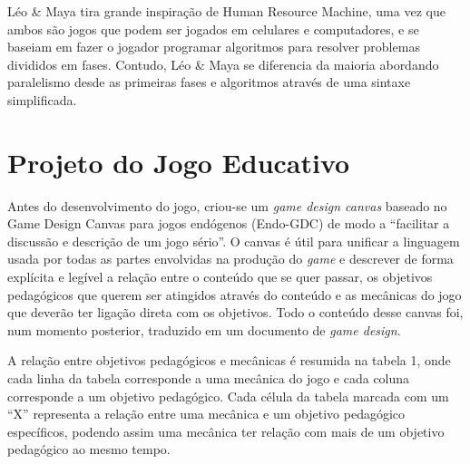 \documentclass[conference]{IEEEtran}
\begin{document}
Léo \& Maya tira grande inspiração de Human Resource Machine\cite{humanresourcemachine}, uma vez que ambos são jogos que podem ser jogados em celulares e computadores, e se baseiam em fazer o jogador programar algoritmos para resolver problemas  divididos em fases. Contudo, Léo \& Maya se diferencia da maioria abordando paralelismo desde as primeiras fases e algoritmos através de uma sintaxe simplificada.

\section{Projeto do Jogo Educativo}
Antes do desenvolvimento do jogo, criou-se um \textit{game design canvas} baseado no Game Design Canvas para jogos endógenos (Endo-GDC) de modo a ``facilitar a discussão e descrição de um jogo sério''\cite{taucei_endo-gdc_nodate}. O canvas é útil para unificar a linguagem usada por todas as partes envolvidas na produção do \textit{game} e descrever de forma explícita e legível a relação entre o conteúdo que se quer passar, os objetivos pedagógicos que querem ser atingidos através do conteúdo e as mecânicas do jogo que deverão ter ligação direta com os objetivos. Todo o conteúdo desse canvas foi, num momento posterior, traduzido em um documento de \textit{game design}. 

A relação entre objetivos pedagógicos e mecânicas é resumida na tabela 1, onde cada linha da tabela corresponde a uma mecânica do jogo e cada coluna corresponde a um objetivo pedagógico. Cada célula da tabela marcada com um ``X'' representa a relação entre uma mecânica e um objetivo pedagógico específicos, podendo assim uma mecânica ter relação com mais de um objetivo pedagógico ao mesmo tempo.
\end{document}
